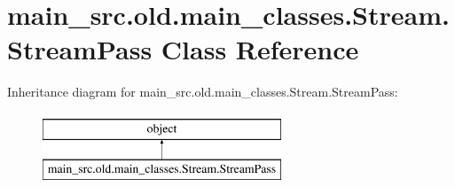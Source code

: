 \hypertarget{classmain__src_8old_1_1main__classes_1_1Stream_1_1StreamPass}{\section{main\-\_\-src.\-old.\-main\-\_\-classes.\-Stream.\-Stream\-Pass Class Reference}
\label{classmain__src_8old_1_1main__classes_1_1Stream_1_1StreamPass}
}
Inheritance diagram for main\-\_\-src.\-old.\-main\-\_\-classes.\-Stream.\-Stream\-Pass\-:\begin{figure}[H]
\begin{center}
\leavevmode
\includegraphics[height=2.000000cm]{classmain__src_8old_1_1main__classes_1_1Stream_1_1StreamPass}
\end{center}
\end{figure}
